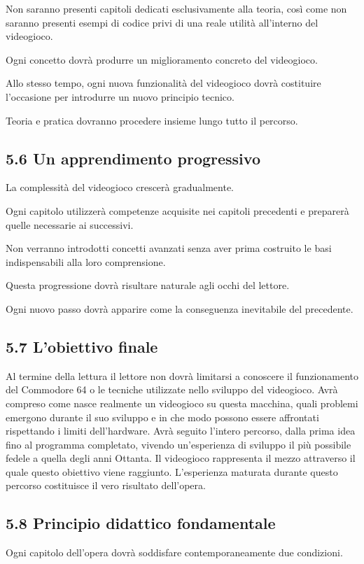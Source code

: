\documentclass{article}
\begin{document}
Non saranno presenti capitoli dedicati esclusivamente alla teoria, così come non saranno presenti esempi di codice privi
di una reale utilità all'interno del videogioco.

Ogni concetto dovrà produrre un miglioramento concreto del videogioco.

Allo stesso tempo, ogni nuova funzionalità del videogioco dovrà costituire l'occasione per introdurre un nuovo principio
tecnico.

Teoria e pratica dovranno procedere insieme lungo tutto il percorso.

\subsection{5.6 Un apprendimento progressivo}
La complessità del videogioco crescerà gradualmente.

Ogni capitolo utilizzerà competenze acquisite nei capitoli precedenti e preparerà quelle necessarie ai successivi.

Non verranno introdotti concetti avanzati senza aver prima costruito le basi indispensabili alla loro comprensione.

Questa progressione dovrà risultare naturale agli occhi del lettore.

Ogni nuovo passo dovrà apparire come la conseguenza inevitabile del precedente.

\subsection[5.7 L{}'obiettivo finale]{5.7 L'obiettivo finale}
Al termine della lettura il lettore non dovrà limitarsi a conoscere il funzionamento del Commodore 64 o le tecniche
utilizzate nello sviluppo del videogioco. Avrà compreso come nasce realmente un videogioco su questa macchina, quali
problemi emergono durante il suo sviluppo e in che modo possono essere affrontati rispettando i limiti dell'hardware.
Avrà seguito l'intero percorso, dalla prima idea fino al programma completato, vivendo un'esperienza di sviluppo il più
possibile fedele a quella degli anni Ottanta. Il videogioco rappresenta il mezzo attraverso il quale questo obiettivo
viene raggiunto. L'esperienza maturata durante questo percorso costituisce il vero risultato dell'opera.

\subsection{5.8 Principio didattico fondamentale}
Ogni capitolo dell'opera dovrà soddisfare contemporaneamente due condizioni.
\end{document}
